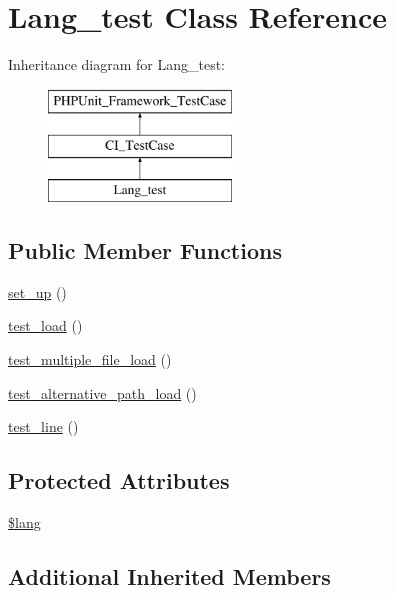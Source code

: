 \hypertarget{class_lang__test}{}\section{Lang\+\_\+test Class Reference}
\label{class_lang__test}
Inheritance diagram for Lang\+\_\+test\+:\begin{figure}[H]
\begin{center}
\leavevmode
\includegraphics[height=3.000000cm]{class_lang__test}
\end{center}
\end{figure}
\subsection*{Public Member Functions}
\begin{DoxyCompactItemize}
\item 
\hyperlink{class_lang__test_a69829875c8d4b6ce94908445c4155741}{set\+\_\+up} ()
\item 
\hyperlink{class_lang__test_ae8db85d194058ce3ae0a8544d9f6cb85}{test\+\_\+load} ()
\item 
\hyperlink{class_lang__test_ad6621ed8efd83774c1cd39b83896ddc2}{test\+\_\+multiple\+\_\+file\+\_\+load} ()
\item 
\hyperlink{class_lang__test_a0b2662a5c373a76622db4a581b437bc3}{test\+\_\+alternative\+\_\+path\+\_\+load} ()
\item 
\hyperlink{class_lang__test_ac773cc6bd1c879c4d47a062153f54fdf}{test\+\_\+line} ()
\end{DoxyCompactItemize}
\subsection*{Protected Attributes}
\begin{DoxyCompactItemize}
\item 
\hyperlink{class_lang__test_a7714b111b644017933931ec69a154102}{\$lang}
\end{DoxyCompactItemize}
\subsection*{Additional Inherited Members}


